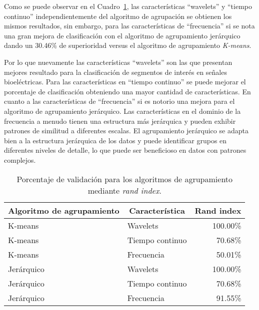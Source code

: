 Como se puede observar en el Cuadro~\ref{cuadro:resultado rand index}, las características ``wavelets'' y ``tiempo continuo'' independientemente del algoritmo de agrupación se obtienen los mismos resultados, sin embargo, para  las características de ``frecuencia'' si se nota una gran mejora de clasificación con el algoritmo de agrupamiento jerárquico dando un 30.46\% de superioridad versus el algoritmo de agrupamiento \textit{K-means}.

Por lo que nuevamente las características ``wavelets'' son las que presentan mejores resultado para la clasificación de segmentos de interés en señales bioeléctricas. Para las características en ``tiempo continuo'' se puede mejorar el porcentaje de clasificación obteniendo una mayor cantidad de características. En cuanto a las características de ``frecuencia'' si es notorio una mejora para el algoritmo de agrupamiento jerárquico. Las características en el dominio de la frecuencia a menudo tienen una estructura más jerárquica y pueden exhibir patrones de similitud a diferentes escalas. El agrupamiento jerárquico se adapta bien a la estructura jerárquica de los datos y puede identificar grupos en diferentes niveles de detalle, lo que puede ser beneficioso en datos con patrones complejos.

\begin{table}[H]
\begin{center}
    \begin{tabular}{|l|l|r|}
    \hline
        \multicolumn{1}{|c|}{\textbf{Algoritmo de agrupamiento}} & \multicolumn{1}{c|}{\textbf{Característica}} & \multicolumn{1}{c|}{\textbf{Rand index}}\\ \hline
        K-means  & Wavelets &  100.00\% \\ \hline
        K-means  & Tiempo continuo & 70.68\% \\ \hline
        K-means  & Frecuencia & 50.01\% \\ \hline
        Jerárquico & Wavelets &  100.00\% \\ \hline
        Jerárquico & Tiempo continuo & 70.68\% \\ \hline
        Jerárquico & Frecuencia & 91.55\% \\ \hline
    \end{tabular}
    \caption[Resultado rand index para algoritmos de agrupamiento]{Porcentaje de validación para los algoritmos de agrupamiento mediante \textit{rand index}.} 
    \label{cuadro:resultado rand index}
\end{center}
\end{table}

